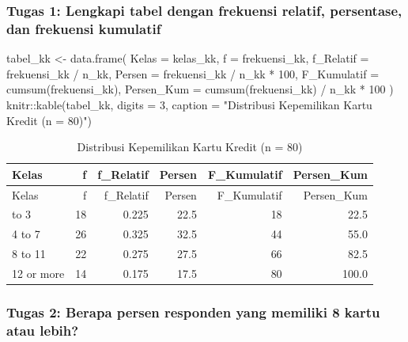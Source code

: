 \documentclass[
  indonesian,
  letterpaper,
]{book}
\newenvironment{Shaded}{\begin{snugshade}}{\end{snugshade}}
\newcommand{\AttributeTok}[1]{\textcolor[rgb]{0.40,0.45,0.13}{#1}}
\newcommand{\DecValTok}[1]{\textcolor[rgb]{0.68,0.00,0.00}{#1}}
\newcommand{\FunctionTok}[1]{\textcolor[rgb]{0.28,0.35,0.67}{#1}}
\newcommand{\NormalTok}[1]{\textcolor[rgb]{0.00,0.23,0.31}{#1}}
\newcommand{\OtherTok}[1]{\textcolor[rgb]{0.00,0.23,0.31}{#1}}
\newcommand{\SpecialCharTok}[1]{\textcolor[rgb]{0.37,0.37,0.37}{#1}}
\newcommand{\StringTok}[1]{\textcolor[rgb]{0.13,0.47,0.30}{#1}}
\begin{document}
\subsubsection{Tugas 1: Lengkapi tabel dengan frekuensi relatif,
persentase, dan frekuensi
kumulatif}\label{tugas-1-lengkapi-tabel-dengan-frekuensi-relatif-persentase-dan-frekuensi-kumulatif}

\begin{Shaded}
\begin{Highlighting}[]
\NormalTok{tabel\_kk }\OtherTok{\textless{}{-}} \FunctionTok{data.frame}\NormalTok{(}
\AttributeTok{Kelas =}\NormalTok{ kelas\_kk,}
\AttributeTok{f =}\NormalTok{ frekuensi\_kk,}
\AttributeTok{f\_Relatif =}\NormalTok{ frekuensi\_kk }\SpecialCharTok{/}\NormalTok{ n\_kk,}
\AttributeTok{Persen =}\NormalTok{ frekuensi\_kk }\SpecialCharTok{/}\NormalTok{ n\_kk }\SpecialCharTok{*} \DecValTok{100}\NormalTok{,}
\AttributeTok{F\_Kumulatif =} \FunctionTok{cumsum}\NormalTok{(frekuensi\_kk),}
\AttributeTok{Persen\_Kum =} \FunctionTok{cumsum}\NormalTok{(frekuensi\_kk) }\SpecialCharTok{/}\NormalTok{ n\_kk }\SpecialCharTok{*} \DecValTok{100}
\NormalTok{)}
\NormalTok{knitr}\SpecialCharTok{::}\FunctionTok{kable}\NormalTok{(tabel\_kk, }\AttributeTok{digits =} \DecValTok{3}\NormalTok{, }\AttributeTok{caption =} \StringTok{"Distribusi Kepemilikan Kartu Kredit (n = 80)"}\NormalTok{)}
\end{Highlighting}
\end{Shaded}

\begin{longtable}[]{@{}lrrrrr@{}}
\caption{Distribusi Kepemilikan Kartu Kredit (n = 80)}\tabularnewline
\toprule\noalign{}
Kelas & f & f\_Relatif & Persen & F\_Kumulatif & Persen\_Kum \\
\midrule\noalign{}
\endfirsthead
\toprule\noalign{}
Kelas & f & f\_Relatif & Persen & F\_Kumulatif & Persen\_Kum \\
\midrule\noalign{}
\endhead
\bottomrule\noalign{}
\endlastfoot
0 to 3 & 18 & 0.225 & 22.5 & 18 & 22.5 \\
4 to 7 & 26 & 0.325 & 32.5 & 44 & 55.0 \\
8 to 11 & 22 & 0.275 & 27.5 & 66 & 82.5 \\
12 or more & 14 & 0.175 & 17.5 & 80 & 100.0 \\
\end{longtable}

\subsubsection{Tugas 2: Berapa persen responden yang memiliki 8 kartu
atau
lebih?}\label{tugas-2-berapa-persen-responden-yang-memiliki-8-kartu-atau-lebih}
\end{document}

